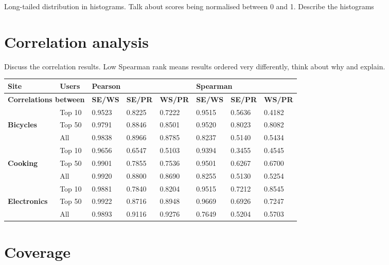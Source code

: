 \documentclass[]{final_report}
\begin{document}
Long-tailed distribution in histograms. Talk about scores being normalised between 0 and 1. Describe the histograms

\section{Correlation analysis}

Discuss the correlation results. Low Spearman rank means results ordered very differently, think about why and explain.

\begin{minipage}{\linewidth}
\centering
\begin{tabular}{|l|l||l|l|l||l|l|l|}
\hline
\textbf{Site} & \textbf{Users} & \multicolumn{3}{l||}{\textbf{Pearson}} & \multicolumn{3}{l|}{\textbf{Spearman}} \\ \hline
\multicolumn{2}{|l||}{\textbf{Correlations between}} & \textbf{SE/WS} & \textbf{SE/PR} & \textbf{WS/PR} & \textbf{SE/WS} & \textbf{SE/PR} & \textbf{WS/PR} \\
\hline
~ 					& Top 10 & 0.9523 & 0.8225 & 0.7222 & 0.9515 & 0.5636 & 0.4182 \\      
\textbf{Bicycles}	& Top 50 & 0.9791 & 0.8846 & 0.8501 & 0.9520 & 0.8023 & 0.8082 \\
~ 					& All    & 0.9838 & 0.8966 & 0.8785 & 0.8237 & 0.5140 & 0.5434 \\
\hline
~           		& Top 10 & 0.9656 & 0.6547 & 0.5103 & 0.9394 & 0.3455 & 0.4545 \\
\textbf{Cooking}    & Top 50 & 0.9901 & 0.7855 & 0.7536 & 0.9501 & 0.6267 & 0.6700 \\
~          			& All    & 0.9920 & 0.8800 & 0.8690 & 0.8255 & 0.5130 & 0.5254 \\
\hline
~           		& Top 10 & 0.9881 & 0.7840 & 0.8204 & 0.9515 & 0.7212 & 0.8545 \\
\textbf{Electronics}& Top 50 & 0.9922 & 0.8716 & 0.8948 & 0.9669 & 0.6926 & 0.7247 \\
~           		& All    & 0.9893 & 0.9116 & 0.9276 & 0.7649 & 0.5204 & 0.5703 \\
\hline
\end{tabular}\par
{} \label{tab:corrresults}
\end{minipage}

\section{Coverage}
\end{document}
